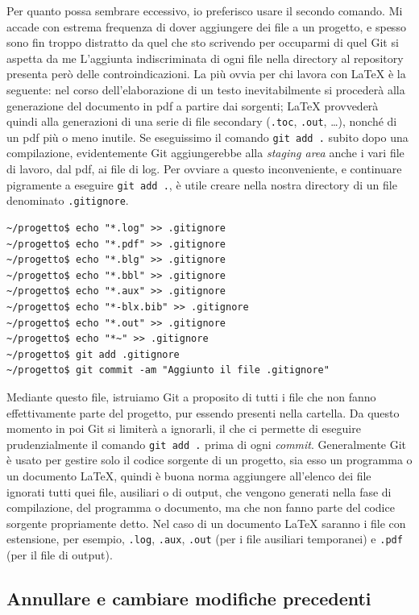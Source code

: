 \documentclass[a4paper,12pt,oneside]{article}
\begin{document}
Per quanto possa sembrare eccessivo, io preferisco usare il secondo comando.
Mi accade con estrema frequenza di
dover aggiungere dei file a un progetto, e spesso sono fin troppo
distratto da quel che sto scrivendo per occuparmi di quel Git si aspetta da me
L'aggiunta indiscriminata di ogni file nella directory al repository presenta
però delle controindicazioni.
La più ovvia per chi lavora con \LaTeX{} è la seguente:
nel corso dell'elaborazione di un testo inevitabilmente si
procederà alla generazione del documento in pdf a partire dai sorgenti;
\LaTeX{} provvederà quindi alla generazioni di una serie di file secondary
(\lstinline|.toc|, \lstinline|.out|, \dots), nonché di un pdf più o meno inutile.
Se eseguissimo il comando \lstinline|git add .| subito dopo una compilazione,
evidentemente Git aggiungerebbe alla \emph{staging area} anche i vari file di
lavoro, dal pdf, ai file  di log. Per ovviare a questo inconveniente, e continuare
pigramente a eseguire \lstinline|git add .|, è utile creare nella nostra
directory di un file denominato \lstinline|.gitignore|.
\begin{lstlisting}
~/progetto$ echo "*.log" >> .gitignore
~/progetto$ echo "*.pdf" >> .gitignore
~/progetto$ echo "*.blg" >> .gitignore
~/progetto$ echo "*.bbl" >> .gitignore
~/progetto$ echo "*.aux" >> .gitignore
~/progetto$ echo "*-blx.bib" >> .gitignore
~/progetto$ echo "*.out" >> .gitignore
~/progetto$ echo "*~" >> .gitignore
~/progetto$ git add .gitignore
~/progetto$ git commit -am "Aggiunto il file .gitignore"
\end{lstlisting}

Mediante questo file, istruiamo Git a proposito di tutti i file che non fanno
effettivamente parte del progetto, pur essendo presenti nella cartella.  Da
questo momento in poi Git si limiterà a ignorarli, il che ci permette di
eseguire prudenzialmente il comando \lstinline|git add .| prima di ogni
\emph{commit}. Generalmente Git è usato per gestire solo il codice sorgente di
un progetto, sia esso un programma o un documento \LaTeX, quindi è buona norma
aggiungere all'elenco dei file ignorati tutti quei file, ausiliari o di output,
che vengono generati nella fase di compilazione, del programma o documento, ma
che non fanno parte del codice sorgente propriamente detto. Nel caso di un
documento \LaTeX{} saranno i file con estensione, per esempio, \lstinline|.log|,
\lstinline|.aux|, \lstinline|.out| (per i file ausiliari temporanei) e
\lstinline|.pdf| (per il file di output).

\subsection{Annullare e cambiare modifiche precedenti}
\label{sec:annullare-modifiche}
\end{document}
